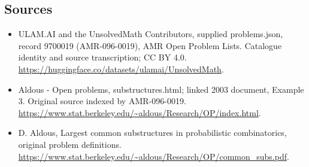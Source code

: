 \documentclass[11pt,a4paper]{article}
\begin{document}
\subsection{Sources}
\begin{itemize}
\item[S1] ULAM.AI and the UnsolvedMath Contributors, supplied problems.json, record 9700019 (AMR-096-0019), AMR Open Problem Lists. Catalogue identity and source transcription; CC BY 4.0.
\url{https://huggingface.co/datasets/ulamai/UnsolvedMath}.
\item[S2] Aldous - Open problems, substructures.html; linked 2003 document, Example 3. Original source indexed by AMR-096-0019.
\url{https://www.stat.berkeley.edu/~aldous/Research/OP/index.html}.
\item[S3] D. Aldous, Largest common substructures in probabilistic combinatorics, original problem definitions.
\url{https://www.stat.berkeley.edu/~aldous/Research/OP/common_subs.pdf}.
\end{itemize}
\end{document}
